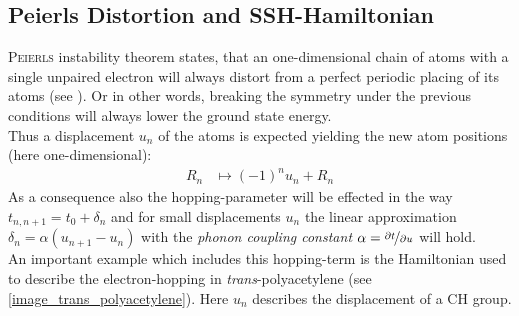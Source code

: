 \subsection{Peierls Distortion and SSH-Hamiltonian}
\label{chapter_Peierls_SSH}
\textsc{Peierls} instability theorem states, that an one-dimensional chain of atoms with a single unpaired electron will always distort from a perfect periodic placing of its atoms (see \cite{chandrasekhar,nalwa}). Or in other words, breaking the symmetry under the previous conditions will always lower the ground state energy.\\
Thus a displacement $u_n$ of the atoms is expected yielding the new atom positions (here one-dimensional):
\begin{align}
	R_n &\mapsto (-1)^{n}u_n + R_n
\end{align}
As a consequence also the hopping-parameter will be effected in the way $t_{n, n+1} = t_0 + \delta_n$ and for small displacements $u_n$ the linear approximation $\delta_n = \alpha (u_{n+1} - u_n)$ with the \emph{phonon coupling constant} $\alpha = \nicefrac{\partial t}{\partial u}$ will hold.\\
An important example which includes this hopping-term is the Hamiltonian used to describe the electron-hopping in \emph{trans}-polyacetylene (see \cref{image_trans_polyacetylene}). Here $u_n$ describes the displacement of a CH group.\\
